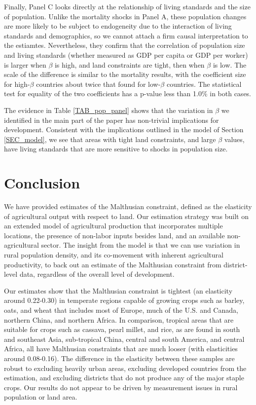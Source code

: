 \documentclass[11pt]{article}
\begin{document}
Finally, Panel C looks directly at the relationship of living standards and the size of population. Unlike the mortality shocks in Panel A, these population changes are more likely to be subject to endogeneity due to the interaction of living standards and demographics, so we cannot attach a firm causal interpretation to the estiamtes. Nevertheless, they confirm that the correlation of population size and living standards (whether measured as GDP per capita or GDP per worker) is larger when $\beta$ is high, and land constraints are tight, then when $\beta$ is low. The scale of the difference is similar to the mortality results, with the coefficient size for high-$\beta$ countries about twice that found for low-$\beta$ countries. The statistical test for equality of the two coefficients has a p-value less than 1.0\% in both cases.

The evidence in Table \ref{TAB_pop_panel} shows that the variation in $\beta$ we identified in the main part of the paper has non-trivial implications for development. Consistent with the implications outlined in the model of Section \ref{SEC_model}, we see that areas with tight land constraints, and large $\beta$ values, have living standards that are more sensitive to shocks in population size. 

\section{Conclusion}
We have provided estimates of the Malthusian constraint, defined as the elasticity of agricultural output with respect to land. Our estimation strategy was built on an extended model of agricultural production that incorporates multiple locations, the presence of non-labor inputs besides land, and an available non-agricultural sector. The insight from the model is that we can use variation in rural population density, and its co-movement with inherent agricultural productivity, to back out an estimate of the Malthusian constraint from district-level data, regardless of the overall level of development.

Our estimates show that the Malthusian constraint is tightest (an elasticity around 0.22-0.30) in temperate regions capable of growing crops such as barley, oats, and wheat that includes most of Europe, much of the U.S. and Canada, northern China, and northern Africa. In comparison, tropical areas that are suitable for crops such as cassava, pearl millet, and rice, as are found in south and southeast Asia, sub-tropical China, central and south America, and central Africa, all have Malthusian constraints that are much looser (with elasticities around 0.08-0.16). The difference in the elasticity between these samples are robust to excluding heavily urban areas, excluding developed countries from the estimation, and excluding districts that do not produce any of the major staple crops. Our results do not appear to be driven by measurement issues in rural population or land area.
\end{document}
